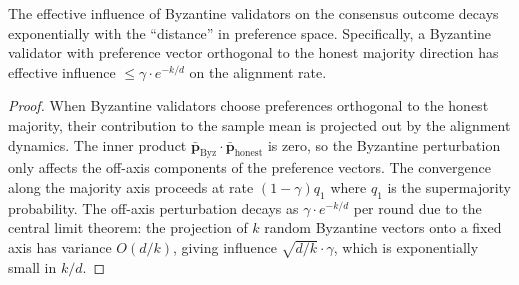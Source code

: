\begin{lemma}
\label{lem:field-screening}
The effective influence of Byzantine validators on the consensus outcome decays
exponentially with the ``distance'' in preference space. Specifically, a Byzantine
validator with preference vector orthogonal to the honest majority direction has
effective influence $\leq \gamma \cdot e^{-k/d}$ on the alignment rate.
\end{lemma}

\begin{proof}
When Byzantine validators choose preferences orthogonal to the honest majority, their
contribution to the sample mean is projected out by the alignment dynamics. The inner
product $\bar{\mathbf{p}}_{\text{Byz}} \cdot \bar{\mathbf{p}}_{\text{honest}}$ is zero,
so the Byzantine perturbation only affects the off-axis components of the preference
vectors. The convergence along the majority axis proceeds at rate $(1 - \gamma)q_1$
where $q_1$ is the supermajority probability. The off-axis perturbation decays as
$\gamma \cdot e^{-k/d}$ per round due to the central limit theorem: the projection of
$k$ random Byzantine vectors onto a fixed axis has variance $O(d/k)$, giving influence
$\sqrt{d/k} \cdot \gamma$, which is exponentially small in $k/d$.
\end{proof}

